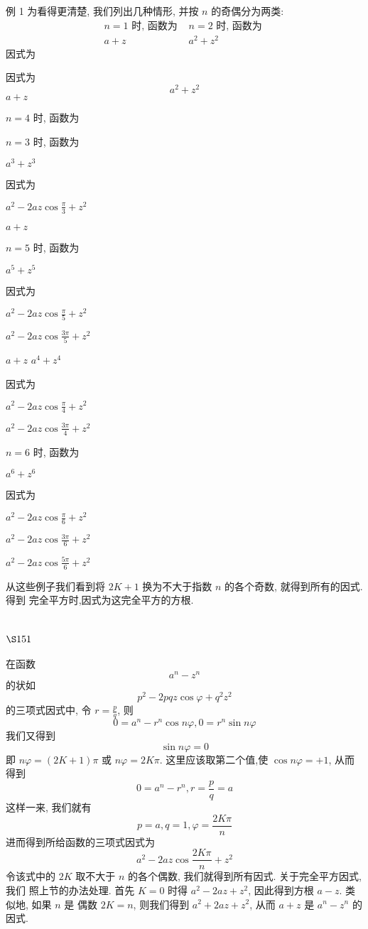 例 1 为看得更清楚, 我们列出几种情形, 并按 $n$ 的奇偶分为两类: 
\[
\begin{array}{c|c}
n=1 \text { 时, 函数为 } & n=2 \text { 时, 函数为 } \\
a+z & a^{2}+z^{2}
\end{array}
\]
因式为

因式为
\[
a^{2}+z^{2}
\]
$a+z$

$n=4$ 时, 函数为

$n=3$ 时, 函数为

$a^{3}+z^{3}$

因式为

$a^{2}-2 a z \cos \frac{\pi}{3}+z^{2}$

$a+z$

$n=5$ 时, 函数为

$a^{5}+z^{5}$

因式为

$a^{2}-2 a z \cos \frac{\pi}{5}+z^{2}$

$a^{2}-2 a z \cos \frac{3 \pi}{5}+z^{2}$

$a+z$ $a^{4}+z^{4}$

因式为

$a^{2}-2 a z \cos \frac{\pi}{4}+z^{2}$

$a^{2}-2 a z \cos \frac{3 \pi}{4}+z^{2}$

$n=6$ 时, 函数为

$a^{6}+z^{6}$

因式为

$a^{2}-2 a z \cos \frac{\pi}{6}+z^{2}$

$a^{2}-2 a z \cos \frac{3 \pi}{6}+z^{2}$

$a^{2}-2 a z \cos \frac{5 \pi}{6}+z^{2}$

从这些例子我们看到将 $2 K+1$ 换为不大于指数 $n$ 的各个奇数, 就得到所有的因式. 得到 完全平方时,因式为这完全平方的方根.

\section{$\S 151$}

在函数
\[
a^{n}-z^{n}
\]
的状如
\[
p^{2}-2 p q z \cos \varphi+q^{2} z^{2}
\]
的三项式因式中, 令 $r=\frac{p}{q}$, 则
\[
0=a^{n}-r^{n} \cos n \varphi, 0=r^{n} \sin n \varphi
\]
我们又得到
\[
\sin n \varphi=0
\]
即 $n \varphi=(2 K+1) \pi$ 或 $n \varphi=2 K \pi$. 这里应该取第二个值,使 $\cos n \varphi=+1$, 从而得到
\[
0=a^{n}-r^{n}, r=\frac{p}{q}=a
\]
这样一来, 我们就有 
\[
p=a, q=1, \varphi=\frac{2 K \pi}{n}
\]
进而得到所给函数的三项式因式为
\[
a^{2}-2 a z \cos \frac{2 K \pi}{n}+z^{2}
\]
令该式中的 $2 K$ 取不大于 $n$ 的各个偶数, 我们就得到所有因式. 关于完全平方因式, 我们 照上节的办法处理. 首先 $K=0$ 时得 $a^{2}-2 a z+z^{2}$, 因此得到方根 $a-z$. 类似地, 如果 $n$ 是 偶数 $2 K=n$, 则我们得到 $a^{2}+2 a z+z^{2}$, 从而 $a+z$ 是 $a^{n}-z^{n}$ 的因式.

